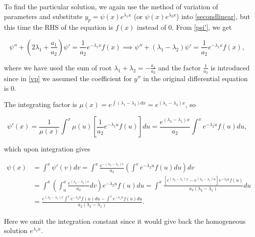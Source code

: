\documentclass[english,a4paper,12pt]{report}
\begin{document}
To find the particular solution, we again use the method of variation of parameters and substitute \(\displaystyle y_{p} = \psi (x)e^{\lambda _{1}x }\) (or \(\psi (x)e^{\lambda _{2}x } \)) into \cref{secondlinear}, but this time the RHS of the equation is \(f(x)\) instead of 0. From \cref{psi'}, we get 

\begin{equation}
    \psi '' + \left(2\lambda _{1} + \frac{a_1 }{a_2 } \right)  \psi ' = \frac{1}{a_2 } e^{-\lambda _{1}x }f(x) \implies \psi '' + \left(\lambda _{1}  - \lambda _{2} \right) \psi ' = \frac{1}{a_2 } e^{-\lambda _{1} x } f(x), 
\end{equation}

where we have used the sum of root \(\displaystyle \lambda _{1} + \lambda _{2} = -\frac{a_1 }{a_{2}}  \) and the factor \(\displaystyle \frac{1}{a_2 } \) is introduced since in \cref{vp} we assumed the coefficient for \(y''\) in the original differential equation is \(0\).   

The integrating factor is \(\displaystyle \mu  (x) = e^{\int (\lambda _{1} - \lambda _{2}  ) dx} = e^{(\lambda _{1} - \lambda _{2}  )x}  \), so

\begin{equation}
    \psi'(x) = \frac{1}{\mu (x)} \int^x \mu (u) \left[ \frac{1}{a_2} e^{-\lambda_1 u} f(u) \right] du = \frac{e^{(\lambda_2 - \lambda_1)x}}{a_2} \int^x e^{-\lambda_2 u} f(u) du,
\end{equation}

which upon integration gives

\begin{equation}
    \begin{aligned}
    \psi(x) &= \int^x \psi'(v) dv = \int^x \frac{e^{-(\lambda_2 - \lambda_1) v}}{a_2} \left(\int^v e^{-\lambda_2 u} f(u) du \right) dv \\
    & = \int^x \left( \int^x_u \frac{e^{(\lambda_2 - \lambda_1) v}}{a_2}  dv \right) e^{-\lambda_2 u} f(u)  du = \int^x \frac{\left[e^{(\lambda_2 - \lambda_1) x} - e^{(\lambda_2 - \lambda_1) u}\right] e^{-\lambda_2 u} f(u)}{a_2 (\lambda_2 - \lambda_1)}  du \\
    &= \frac{e^{(\lambda_2 - \lambda_1) x} \int^x e^{-\lambda_2 u} f(u)  du - \int^x e^{-\lambda_1 u} f(u)  du}{a_2 (\lambda_2 - \lambda_1)}.
    \end{aligned}
\end{equation}

Here we omit the integration constant since it would give back the homogeneous solution \(e^{\lambda _{1}x } \).
\end{document}
